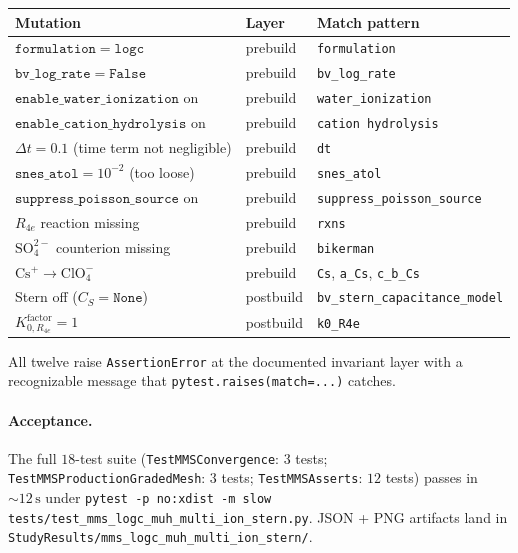 \documentclass[11pt]{article}
\begin{document}
\begin{center}
\small
\begin{tabular}{lll}
\toprule
Mutation & Layer & Match pattern \\
\midrule
$\mathtt{formulation} = \mathtt{logc}$       & prebuild & \verb|formulation| \\
$\mathtt{bv\_log\_rate} = \mathtt{False}$    & prebuild & \verb|bv_log_rate| \\
$\mathtt{enable\_water\_ionization}$ on      & prebuild & \verb|water_ionization| \\
$\mathtt{enable\_cation\_hydrolysis}$ on     & prebuild & \verb|cation hydrolysis| \\
$\Delta t = 0.1$ (time term not negligible)  & prebuild & \verb|dt| \\
$\mathtt{snes\_atol} = 10^{-2}$ (too loose)  & prebuild & \verb|snes_atol| \\
$\mathtt{suppress\_poisson\_source}$ on      & prebuild & \verb|suppress_poisson_source| \\
$R_{4e}$ reaction missing                    & prebuild & \verb|rxns| \\
$\mathrm{SO_4^{2-}}$ counterion missing      & prebuild & \verb|bikerman| \\
$\mathrm{Cs^+} \to \mathrm{ClO_4^-}$         & prebuild & \verb|Cs|, \verb|a_Cs|, \verb|c_b_Cs| \\
Stern off ($C_S = \mathtt{None}$)            & postbuild & \verb|bv_stern_capacitance_model| \\
$K_{0,R_{4e}}^\mathrm{factor} = 1$           & postbuild & \verb|k0_R4e| \\
\bottomrule
\end{tabular}
\end{center}

All twelve raise \verb|AssertionError| at the documented invariant
layer with a recognizable message that \verb|pytest.raises(match=...)|
catches.

\paragraph{Acceptance.} The full $18$-test suite
(\verb|TestMMSConvergence|: $3$ tests; \verb|TestMMSProductionGradedMesh|:
$3$ tests; \verb|TestMMSAsserts|: $12$ tests) passes in
$\sim\!12\,\text{s}$ under
\verb|pytest -p no:xdist -m slow tests/test_mms_logc_muh_multi_ion_stern.py|.
JSON + PNG artifacts land in
\verb|StudyResults/mms_logc_muh_multi_ion_stern/|.
\end{document}
